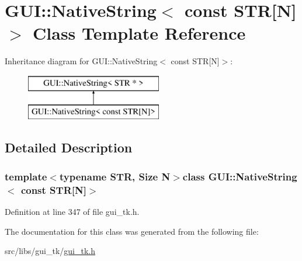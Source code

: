 \hypertarget{classGUI_1_1NativeString_3_01const_01STR[N]_4}{\section{G\-U\-I\-:\-:Native\-String$<$ const S\-T\-R\mbox{[}N\mbox{]}$>$ Class Template Reference}
\label{classGUI_1_1NativeString_3_01const_01STR[N]_4}
}
Inheritance diagram for G\-U\-I\-:\-:Native\-String$<$ const S\-T\-R\mbox{[}N\mbox{]}$>$\-:\begin{figure}[H]
\begin{center}
\leavevmode
\includegraphics[height=2.000000cm]{classGUI_1_1NativeString_3_01const_01STR[N]_4}
\end{center}
\end{figure}


\subsection{Detailed Description}
\subsubsection*{template$<$typename S\-T\-R, Size N$>$class G\-U\-I\-::\-Native\-String$<$ const S\-T\-R\mbox{[}\-N\mbox{]}$>$}



Definition at line 347 of file gui\-\_\-tk.\-h.



The documentation for this class was generated from the following file\-:\begin{DoxyCompactItemize}
\item 
src/libs/gui\-\_\-tk/\hyperlink{gui__tk_8h}{gui\-\_\-tk.\-h}\end{DoxyCompactItemize}

